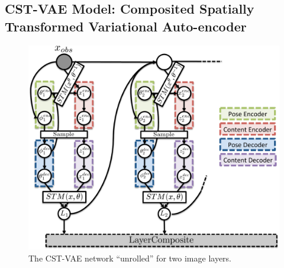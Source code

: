 


  
 
 
 


\subsection{{\bf CST-VAE} Model: Composited Spatially Transformed Variational Auto-encoder}\label{sec:cstvae}


\begin{figure}[t]
\begin{center}
\includegraphics[width=0.55\linewidth]{figs/compositestvae.pdf}
\end{center}
 \caption{
The CST-VAE network ``unrolled'' for two image layers.
 }
\label{fig:cstvae}
\end{figure}

